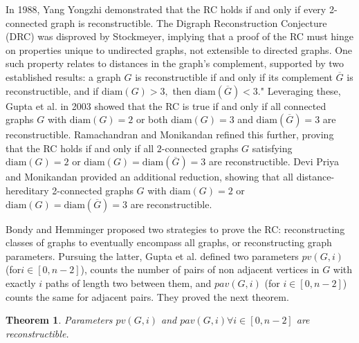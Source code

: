 \documentclass[11pt,oneside]{article}
\newtheorem{thm}{Theorem}
\theoremstyle{definition}
\begin{document}
\indent In 1988, Yang Yongzhi \cite{y} demonstrated that the RC holds if and only if every 2-connected graph is reconstructible. The Digraph Reconstruction Conjecture (DRC) was disproved by Stockmeyer\cite{pks},  implying that a proof of the RC must hinge on properties unique to undirected graphs, not extensible to directed graphs.  One such property relates to distances in the graph's complement, supported by two established results: a graph $G$ is reconstructible if and only if  its complement $\overline{G}$ is reconstructible, and if $\mathrm{diam}(G)>3,$ then $\mathrm{diam}(\overline{G})<3.$" Leveraging these, Gupta et al. \cite{g} in 2003 showed that the RC is true if and only if all connected graphs $G$ with $\text{diam}(G)=2$ or both $\mathrm{diam}(G)=3$ and $\mathrm{diam}(\overline{G})=3$ are reconstructible.  Ramachandran and Monikandan \cite{r} refined this further, proving that the RC holds if and only if all $2$-connected graphs $G$ satisfying $\mathrm{diam}(G)=2$ or $\mathrm{diam}(G)=\mathrm{diam}(\overline{G})=3$ are reconstructible. Devi Priya and Monikandan \cite{d} provided an additional reduction, showing that all distance-hereditary 2-connected graphs $G$ with $\mathrm{diam}(G)=2$ or $\mathrm{diam}(G)=\mathrm{diam}(\overline{G})=3$ are reconstructible.

Bondy and Hemminger \cite{b} proposed two strategies to prove the RC: reconstructing classes of graphs to eventually encompass all graphs, or reconstructing  graph parameters. Pursuing the latter,   Gupta et al. \cite{g} defined two parameters $pv(G,i)$ (for$i \in [0,n-2]$), counts the number of pairs of non adjacent vertices in $G$ with exactly $i$ paths of length two between them, and $pav(G,i)$ (for $i \in [0,n-2]$) counts the same for adjacent pairs. They proved the next theorem. 

\begin{thm}\label{1}
Parameters $pv(G,i)$ and $pav(G,i) \forall i \in [0,n-2]$ are reconstructible.
\end{thm}
\end{document}
